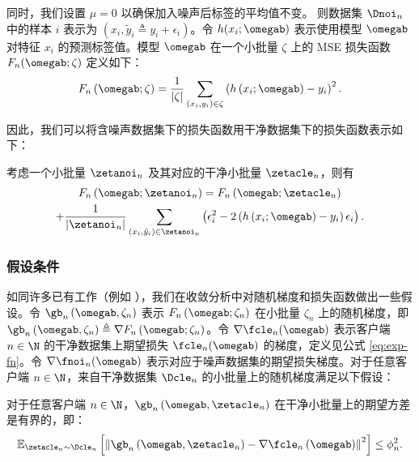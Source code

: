 同时，我们设置 $\mu=0$ 以确保加入噪声后标签的平均值不变。  
则数据集 $\Dnoi_n$ 中的样本 $i$ 表示为 $(x_i,\tilde{y}_i \triangleq y_i+\epsilon_i)$。令 $h(x_i;\omegab)$ 表示使用模型 $\omegab$ 对特征 $x_i$ 的预测标签值。模型 $\omegab$ 在一个小批量 $\zeta$ 上的 MSE 损失函数 $F_{n}(\omegab;\zeta)$ 定义如下：
\begin{equation}\label{eq:mse}
F_n\left(\omegab;\zeta\right)=\frac{1}{|\zeta|}\sum_{\left(x_i,{y}_i\right)\in \zeta}\left(h\left(x_i;\omegab\right)-{y}_i\right)^2.
\end{equation}

因此，我们可以将含噪声数据集下的损失函数用干净数据集下的损失函数表示如下：

\begin{lemma}[带标签噪声的均方误差]\label{lem:mse}
考虑一个小批量 $\zetanoi_n$ 及其对应的干净小批量 $\zetacle_n$，则有
\begin{multline}
F_n\left(\omegab;\zetanoi_n\right)=F_n\left(\omegab;\zetacle_n\right)\\
    +\frac{1}{|\zetanoi_n|}\sum_{\left(x_i,\tilde{y}_i\right)\in \zetanoi_n}\left( \epsilon_i^2 - 2\left(h\left(x_i;\omegab\right)-y_i\right)\epsilon_i \right).
\end{multline}
\end{lemma}

\subsubsection{假设条件}
如同许多已有工作（例如 \cite{b4,b11,b8}），我们在收敛分析中对随机梯度和损失函数做出一些假设。令 $\gb_n\left(\omegab,\zeta_n\right)$ 表示 $F_n\left(\omegab;\zeta_n\right)$ 在小批量 $\zeta_n$ 上的随机梯度，即 $\gb_n\left(\omegab,\zeta_n\right)\triangleq \nabla F_n\left(\omegab;\zeta_n\right)$。令 $\nabla \fcle_n(\omegab)$ 表示客户端 $n\in\N$ 的干净数据集上期望损失 $\fcle_n(\omegab)$ 的梯度，定义见公式 \eqref{eq:exp-fn}。令 $\nabla \fnoi_n(\omegab)$ 表示对应于噪声数据集的期望损失梯度。对于任意客户端 $n\in\N$，来自干净数据集 $\Dcle_n$ 的小批量上的随机梯度满足以下假设：

\begin{assumption}[均方误差下随机梯度的方差]\label{ass:gradient-variance}
对于任意客户端 $n\in\N$，$\gb_n\left(\omegab,\zetacle_n\right)$ 在干净小批量上的期望方差是有界的，即：
\begin{equation}\label{eq:gradient-variance}
    \mathbb{E}_{\zetacle_n\sim \Dcle_n}\left[\left\Vert \gb_n\left(\omegab,\zetacle_n\right) - \nabla \fcle_n\left(\omegab\right) \right\Vert^2 \right] \leq \phi_n^2.
\end{equation}
\end{assumption}

